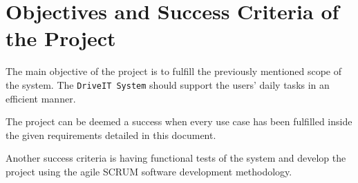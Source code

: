 \section{Objectives and Success Criteria of the Project}
The main objective of the project is to fulfill the previously mentioned scope of the system. 
The \texttt{DriveIT System} should support the users' daily tasks in an efficient manner. 

The project can be deemed a success when every use case has been fulfilled inside the given requirements detailed in this document.

Another success criteria is having functional tests of the system and develop the project using the agile SCRUM software development methodology.